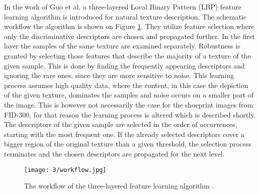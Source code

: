 \documentclass[draft,final]{vutinfth} %
\begin{document}
\par
In the work of Guo et al. \cite{guo2012discriminative} a three-layered Local Binary Pattern (LBP) feature learning algorithm is introduced for natural texture description.
The schematic workflow the algorithm is shown on Figure \ref{fig:pe:workflow}.
They utilize feature selection where only the discriminative descriptors are chosen and propagated further.
In the first layer the samples of the same texture are examined separately.
Robustness is granted by selecting those features that describe the majority of a texture of the given sample.
This is done by finding the frequently appearing descriptors and ignoring the rare ones, since they are more sensitive to noise.
This learning process assumes high quality data, where the content, in this case the depiction of the given texture, dominates the samples and noise occurs on a smaller part of the image.
This is however not necessarily the case for the shoeprint images from FID-300, for that reason the learning process is altered which is described shortly.
The descriptors of the given sample are selected in the order of occurrences, starting with the most frequent one.
If the already selected descriptors cover a bigger region of the original texture than a given threshold, the selection process terminates and the chosen descriptors are propagated for the next level.

\begin{figure}[h]
  \centering
  \texttt{[image: 3/workflow.jpg]}
  \caption{The workflow of the three-layered feature learning algorithm  \cite{guo2012discriminative}.}
  \label{fig:pe:workflow} %
\end{figure}
\end{document}
